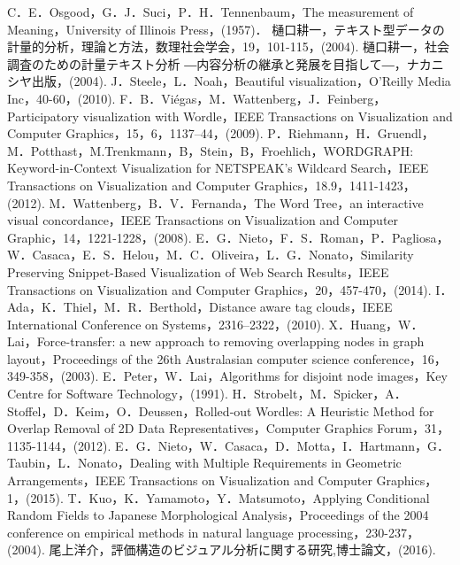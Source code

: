 \documentclass[syuuron]{kuee}
\begin{document}
\begin{thebibliography}{数字}
	 C．E．Osgood，G．J．Suci，P．H．Tennenbaum，The measurement of Meaning，University of Illinois Press，(1957)．
	 樋口耕一，テキスト型データの計量的分析，理論と方法，数理社会学会，19，101-115，(2004).
	 樋口耕一，社会調査のための計量テキスト分析 ―内容分析の継承と発展を目指して―，ナカニシヤ出版，(2004).
	 J．Steele，L．Noah，Beautiful visualization，O'Reilly Media Inc，40-60，(2010).
	 F．B．Viégas，M．Wattenberg，J．Feinberg，Participatory visualization with Wordle，IEEE Transactions on Visualization and Computer Graphics，15，6，1137–44，(2009).
	 P．Riehmann，H．Gruendl，M．Potthast，M.Trenkmann，B，Stein，B，Froehlich，WORDGRAPH: Keyword-in-Context Visualization for NETSPEAK's Wildcard Search，IEEE Transactions on Visualization and Computer Graphics，18.9，1411-1423，(2012).
	 M．Wattenberg，B．V．Fernanda，The Word Tree，an interactive visual concordance，IEEE Transactions on Visualization and Computer Graphic，14，1221-1228，(2008).
	 E．G．Nieto，F．S．Roman，P．Pagliosa，W．Casaca，E．S．Helou，M．C．Oliveira，L．G．Nonato，Similarity Preserving Snippet-Based Visualization of Web Search Results，IEEE Transactions on Visualization and Computer Graphics，20，457-470，(2014).
	 I．Ada，K．Thiel，M．R．Berthold，Distance aware tag clouds，IEEE International Conference on Systems，2316–2322，(2010).
	 X．Huang，W．Lai，Force-transfer: a new approach to removing overlapping nodes in graph layout，Proceedings of the 26th Australasian computer science conference，16，349-358，(2003).
	 E．Peter，W．Lai，Algorithms for disjoint node images，Key Centre for Software Technology，(1991).
	 H．Strobelt，M．Spicker，A．Stoffel，D．Keim，O．Deussen，Rolled‐out Wordles: A Heuristic Method for Overlap Removal of 2D Data Representatives，Computer Graphics Forum，31，1135-1144，(2012).
	 E．G．Nieto，W．Casaca，D．Motta，I．Hartmann，G．Taubin，L．Nonato，Dealing with Multiple Requirements in Geometric Arrangements，IEEE Transactions on Visualization and Computer Graphics，1，(2015).
	 T．Kuo，K．Yamamoto，Y．Matsumoto，Applying Conditional Random Fields to Japanese Morphological Analysis，Proceedings of the 2004 conference on empirical methods in natural language processing，230-237，(2004).
	 尾上洋介，評価構造のビジュアル分析に関する研究,博士論文，(2016).
\end{thebibliography}

\appendix
\end{document}

